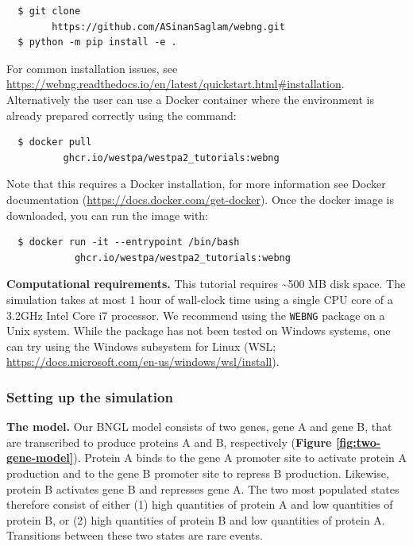 \begin{verbatim}
  $ git clone 
        https://github.com/ASinanSaglam/webng.git
  $ python -m pip install -e .
\end{verbatim}

For common installation issues, see {\url{https://webng.readthedocs.io/en/latest/quickstart.html#installation}}. Alternatively the user can use a Docker container where the environment is already prepared correctly using the command: 
\begin{verbatim}
  $ docker pull 
          ghcr.io/westpa/westpa2_tutorials:webng
\end{verbatim}

Note that this requires a Docker installation, for more information see Docker documentation ({\url{https://docs.docker.com/get-docker}}). 
Once the docker image is downloaded, you can run the image with:
\begin{verbatim}
  $ docker run -it --entrypoint /bin/bash 
            ghcr.io/westpa/westpa2_tutorials:webng
\end{verbatim}

\textbf{Computational requirements.} This tutorial requires \textasciitilde500 MB disk space. 
The simulation takes at most 1 hour of wall-clock time using a single CPU core of a 3.2GHz Intel Core i7 processor. 
We recommend using the \verb|WEBNG| package on a Unix system. 
While the package has not been tested on Windows systems, one can try using the Windows subsystem for Linux (WSL; {\url{https://docs.microsoft.com/en-us/windows/wsl/install}}).

\subsubsection{Setting up the simulation}

\noindent\textbf{The model.} Our BNGL model consists of two genes, gene A and gene B, that are transcribed to produce proteins A and B, respectively (\textbf{Figure \ref{fig:two-gene-model}}). 
Protein A binds to the gene A promoter site to activate protein A production and to the gene B promoter site to repress B production. 
Likewise, protein B activates gene B and represses gene A. 
The two most populated states therefore consist of either (1) high quantities of protein A and low quantities of protein B, or (2) high quantities of protein B and low quantities of protein A. 
Transitions between these two states are rare events. 

